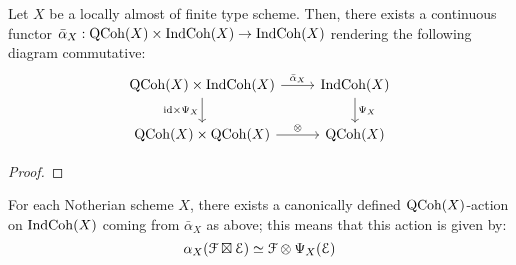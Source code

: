                     \begin{proposition} \label{prop: canonical_action_of_qcoh_on_indcoh}
                        Let $X$ be a locally almost of finite type scheme. Then, there exists a continuous functor $\bar{\alpha}_X: \QCoh(X) \x \Ind\Coh(X) \to \Ind\Coh(X)$ rendering the following diagram commutative:
                            $$
                                \begin{tikzcd}
                                	{\QCoh(X) \x \Ind\Coh(X)} & {\Ind\Coh(X)} \\
                                	{\QCoh(X) \x \QCoh(X)} & {\QCoh(X)}
                                	\arrow["{\id \x \Psi_X}"', from=1-1, to=2-1]
                                	\arrow["\tensor", from=2-1, to=2-2]
                                	\arrow["{\bar{\alpha}_X}", from=1-1, to=1-2]
                                	\arrow["{\Psi_X}", from=1-2, to=2-2]
                                \end{tikzcd}
                            $$
                    \end{proposition}
                        \begin{proof}
                            
                        \end{proof}
                    \begin{corollary} \label{coro: canonical_action_of_qcoh_on_indcoh}
                        For each Notherian scheme $X$, there exists a canonically defined $\mathrm{QCoh}(X)$-action on $\mathrm{Ind}\mathrm{Coh}(X)$ coming from $\bar{\alpha}_X$ as above; this means that this action is given by:
                            $$\alpha_X(\calF \boxtimes \E) \cong \calF \tensor \Psi_X(\E)$$
                    \end{corollary}
                
